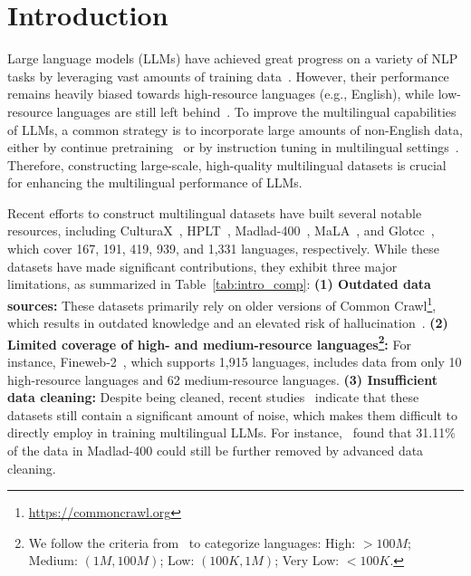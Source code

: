 \section{Introduction}
\label{sec:intro}
Large language models (LLMs) have achieved great progress on a variety of NLP tasks by leveraging vast amounts of training data~\cite{minaee2024large}.
However, their performance remains heavily biased towards high-resource languages (e.g., English), while low-resource languages are still left behind~\cite{zhu2024multilingual,huang2024survey}.
To improve the multilingual capabilities of LLMs, a common strategy is to incorporate large amounts of non-English data, either by continue pretraining~\cite{lai-etal-2024-llms} or by instruction tuning in multilingual settings~\cite{ustun-etal-2024-aya}.
Therefore, constructing large-scale, high-quality multilingual datasets is crucial for enhancing the multilingual performance of LLMs.



%
Recent efforts to construct multilingual datasets have built several notable resources, including CulturaX~\cite{nguyen-etal-2024-culturax}, HPLT~\cite{de-gibert-etal-2024-new}, Madlad-400~\cite{kudugunta2024madlad}, MaLA~\cite{lin2024mala}, and Glotcc~\cite{kargaran2024glotcc}, which cover 167, 191, 419, 939, and 1,331 languages, respectively.
While these datasets have made significant contributions, they exhibit three major limitations, as summarized in Table~\ref{tab:intro_comp}:
\textbf{(1) Outdated data sources:} These datasets primarily rely on older versions of Common Crawl\footnote{\url{https://commoncrawl.org}}, 
which results in outdated knowledge and an elevated risk of hallucination~\cite{huang2023survey}.
\textbf{(2) Limited coverage of high- and medium-resource languages\footnote{We follow the criteria from~\citet{goyal-etal-2022-flores} to categorize languages: High: $>100M$; Medium: $(1M, 100M)$; Low: $(100K, 1M)$; Very Low: $<100K$.}:} For instance, Fineweb-2~\cite{penedo2024fineweb-2}, which supports 1,915 languages, includes data from only 10 high-resource languages and 62 medium-resource languages.
\textbf{(3) Insufficient data cleaning:} Despite being cleaned, recent studies~\cite{dou-etal-2024-sailor,zhang-etal-2024-mc2} indicate that these datasets still contain a significant amount of noise, which makes them difficult to directly employ in training multilingual LLMs. For instance,~\citet{dou-etal-2024-sailor} found that 31.11\% of the data in Madlad-400 could still be further removed by advanced data cleaning.

